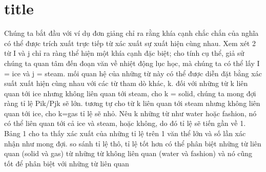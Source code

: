 \documentclass{article}
\begin{document}
\tableofcontents
\section{title}
        Chúng ta bắt đầu với ví dụ đơn giảng chỉ ra rằng khía cạnh chắc chắn của nghĩa có thể được trích xuất trực tiếp từ xác xuất sự xuất hiện cùng nhau. Xem xét 2 từ I và j chỉ ra ràng thể hiện một khía cạnh đặc biệt; cho tính cụ thể, giả sử chúng ta quan tâm đến đoạn văn về nhiệt động lục học, mà chúng ta có thể lấy I = ice và j = steam. mối quan hệ của những từ này có thể được diễn đặt bằng xác suất xuất hiện cùng nhau với các từ tham dò khác, k. đối với những từ k liên quan tới ice nhưng không liên quan tới steam, cho k = solid, chúng ta mong đợi ràng tỉ lệ Pik/Pjk sẽ lớn. tương tự cho từ k liên quan tới steam nhưng không liên quan tới ice, cho k=gas tỉ lệ sẽ nhỏ. Nêu k những từ như water hoặc fashion, nó có thể liên quan tới cả ice và steam, hoặc không,  do đó tỉ lệ sẽ tiến gần về 1. Bảng 1 cho ta thấy xác xuất của những tỉ lệ trên 1 văn thể lớn và số lần xác nhận như mong đợi. so sánh tỉ lệ thô, tỉ lệ tốt hơn có thể phân biệt những từ liên quan (solid và gas) từ những từ không liên quan (water và fashion) và nó cũng tốt để phân biệt với những từ liên quan
\end{document}

